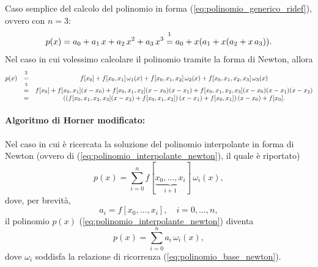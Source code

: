 \begin{example}
	Caso semplice del calcolo del polinomio in forma (\ref{eq:polinomio_generico_ridef}), ovvero con $n=3$:
	\begin{equation*}
		p(x)=a_0+a_1\,x+a_2\,x^2+a_3\,x^3\overset{\footnotemark}{=} a_0+ x(a_1+x(a_2+x\,a_3)).
	\end{equation*}
	Nel caso in cui volessimo calcolare il polinomio tramite la forma di Newton, allora
	\begin{equation*}
		\begin{matrix}
			p(x) &\overset{\footnotemark}{=}& f[x_0] + f[x_0,x_1]\,\omega_1(x) + f[x_0,x_1,x_2]\,\omega_2(x) + f[x_0,x_1,x_2,x_3]\,\omega_3(x)\\
			&\overset{\footnotemark}{=}& f[x_0]+f[x_0,x_1](x-x_0)+f[x_0,x_1,x_2](x-x_0)(x-x_1)+f[x_0,x_1,x_2,x_3](x-x_0)(x-x_1)(x-x_2)\\
			&=&\left(\left(f[x_0,x_1,x_2,x_3](x-x_2) + f[x_0,x_1,x_2]\right)(x-x_1)+f[x_0,x_1]\right)(x-x_0)+f[x_0].
		\end{matrix}
	\end{equation*}
	\addtocounter{footnote}{-1}
	
\end{example}

\paragraph{Algoritmo di Horner modificato:} Nel caso in cui è ricercata la soluzione del polinomio interpolante in forma di Newton (ovvero di (\ref{eq:polinomio_interpolante_newton}), il quale è riportato)
\begin{equation*}
	p(x) = \sum_{i=0}^{n} f[\underbrace{x_0,\hdots, x_i}_{i+1}]\,\omega_i(x),
\end{equation*}
dove, per brevità,
\begin{equation*}
	a_i = f[x_0, \hdots, x_i],\quad i=0, \hdots, n,
\end{equation*}
il polinomio $p(x)$ (\ref{eq:polinomio_interpolante_newton}) diventa
\begin{equation*}
	p(x)= \sum_{i=0}^{n} a_i\,\omega_i(x),
\end{equation*}
dove $\omega_{i}$ soddisfa la relazione di ricorrenza (\ref{eq:polinomio_base_newton}).

